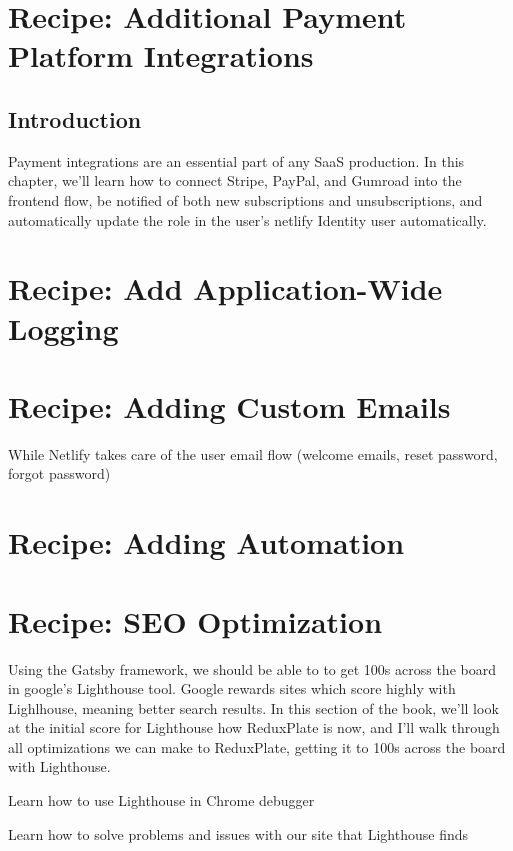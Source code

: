 \documentclass[paper=6in:9in,pagesize=pdftex,headinclude=on,footinclude=on,12pt,twoside]{scrbook}
\begin{document}
\chapter{Recipe: Additional Payment Platform Integrations}

\section{Introduction}

Payment integrations are an essential part of any SaaS production. In this chapter, we'll learn how to connect Stripe, PayPal, and Gumroad into the frontend flow, be notified of both new subscriptions and unsubscriptions, and automatically update the role in the user's netlify Identity user automatically.

\chapter{Recipe: Add Application-Wide Logging}

\chapter{Recipe: Adding Custom Emails}

While Netlify takes care of the user email flow (welcome emails, reset password, forgot password)

\chapter{Recipe: Adding Automation}

\chapter{Recipe: SEO Optimization}


Using the Gatsby framework, we should be able to to get 100s across the board in google's Lighthouse tool. Google rewards sites which score highly with Lighlhouse, meaning better search results. In this section of the book, we'll look at the initial score for Lighthouse how ReduxPlate is now, and I'll walk through all optimizations we can make to ReduxPlate, getting it to 100s across the board with Lighthouse.

\begin{arrows}
\item Learn how to use Lighthouse in Chrome debugger
\item Learn how to solve problems and issues with our site that Lighthouse finds
\end{arrows}
\end{document}
